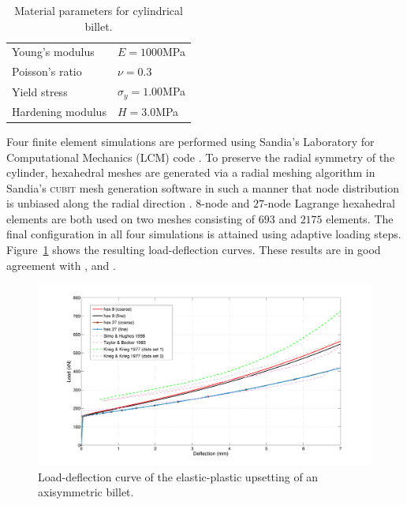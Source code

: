 \documentclass[12pt]{article}
\begin{document}
\begin{table}[htbp]
  \begin{center}
    \begin{tabular}{ l l }
      \toprule      
      Young's modulus
      &
      $E = 1000$MPa
      \\
      Poisson's ratio
      &
      $\nu = 0.3$
      \\
      Yield stress  
      &
      $\sigma_{y} = 1.00$MPa
      \\
      Hardening modulus   
      &
      $H=3.0$MPa
      \\
      \bottomrule
    \end{tabular}
    \caption{Material parameters for cylindrical billet.}
    \label{tab:upset-billet}
  \end{center}
\end{table}

Four finite element simulations are performed using Sandia's Laboratory for
Computational Mechanics (LCM\texttrademark) code \citep{lcm}. To preserve the
radial symmetry of the cylinder, hexahedral meshes are generated via a radial
meshing algorithm in Sandia's \textsc{cubit} mesh generation software in such a
manner that node distribution is unbiased along the radial direction
\citep{cubit}. $8$-node and $27$-node Lagrange hexahedral elements are both used
on two meshes consisting of $693$ and $2175$ elements. The final configuration
in all four simulations is attained using adaptive loading steps.
Figure~\ref{fig:load-deflection} shows the resulting load-deflection curves.
These results are in good agreement with \citet{Krieg.Krieg:1977},
\citet{Taylor.Becker:1983} and \citet{Simo.Hughes:1998}.

\begin{figure}[htbp]
  \begin{center}
    \unitlength=1.0mm
      \includegraphics[width=160mm]{Load_Deflection.pdf}
      \caption{Load-deflection curve of the elastic-plastic upsetting
        of an axisymmetric billet. }
    \label{fig:load-deflection}
  \end{center}
\end{figure}
\end{document}
